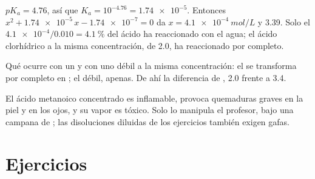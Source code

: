 \begin{example}\label{ex:g12:ka-and-pka:acetic}
$pK_a = 4.76$, así que $K_a = 10^{-4.76} = \num{1.74e-5}$. Entonces
$x^2 + \num{1.74e-5}\,x - \num{1.74e-7} = 0$ da
$x = \qty{4.1e-4}{mol/L}$ y  3.39. Solo el $\num{4.1e-4}/0.010 =
\qty{4.1}{\percent}$ del ácido ha reaccionado con el agua; el ácido
clorhídrico a la misma concentración, de  2.0, ha reaccionado por
completo.
\end{example}

\begin{omfigure}

{\small Qué ocurre con un  y con uno débil a la misma
concentración: el  se transforma por completo en ; el
débil, apenas. De ahí la diferencia de , 2.0 frente a 3.4.}
\end{omfigure}

\begin{safety}{}
El ácido metanoico concentrado es inflamable, provoca quemaduras graves
en la piel y en los ojos, y su vapor es tóxico. Solo lo manipula el
profesor, bajo una campana de ; las disoluciones diluidas de
los ejercicios también exigen gafas.
\end{safety}

\section{Ejercicios}


